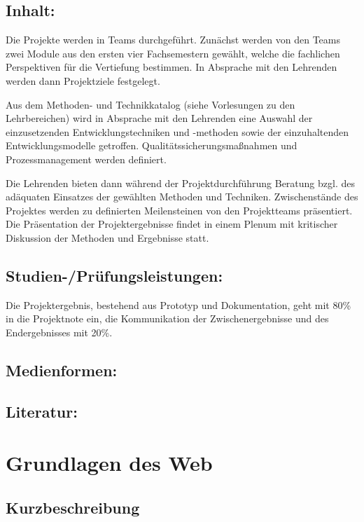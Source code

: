 \section{Inhalt:}\label{inhalt-10}

Die Projekte werden in Teams durchgeführt. Zunächst werden von den Teams
zwei Module aus den ersten vier Fachsemestern gewählt, welche die
fachlichen Perspektiven für die Vertiefung bestimmen. In Absprache mit
den Lehrenden werden dann Projektziele festgelegt.

Aus dem Methoden- und Technikkatalog (siehe Vorlesungen zu den
Lehrbereichen) wird in Absprache mit den Lehrenden eine Auswahl der
einzusetzenden Entwicklungstechniken und -methoden sowie der
einzuhaltenden Entwicklungsmodelle getroffen.
Qualitätssicherungsmaßnahmen und Prozessmanagement werden definiert.

Die Lehrenden bieten dann während der Projektdurchführung Beratung bzgl.
des adäquaten Einsatzes der gewählten Methoden und Techniken.
Zwischenstände des Projektes werden zu definierten Meilensteinen von den
Projektteams präsentiert. Die Präsentation der Projektergebnisse findet
in einem Plenum mit kritischer Diskussion der Methoden und Ergebnisse
statt.

\section{Studien-/Prüfungsleistungen:}\label{studien-pruxfcfungsleistungen-10}

Die Projektergebnis, bestehend aus Prototyp und Dokumentation, geht mit
80\% in die Projektnote ein, die Kommunikation der Zwischenergebnisse
und des Endergebnisses mit 20\%.

\section{Medienformen:}\label{medienformen-10}

\section{Literatur:}\label{literatur-10}

\chapter{Grundlagen des Web}\label{grundlagen-des-web}

\section{Kurzbeschreibung}\label{kurzbeschreibung-2}

